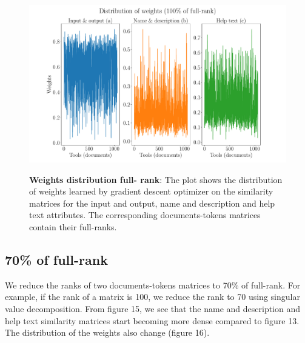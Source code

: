 \begin{figure}[h]
\begin{centering}
    {\includegraphics[scale=0.35]{figures/Weights_100.pdf}}
    \caption[Weights distribution full-rank]{\textbf{Weights distribution full- rank}: The plot shows the distribution of weights learned by gradient descent optimizer on the similarity matrices for the input and output, name and description and help text attributes. The corresponding documents-tokens matrices contain their full-ranks.}
\end{centering}
\end{figure}

\subsection{70\% of full-rank}
We reduce the ranks of two documents-tokens matrices to 70\% of full-rank. For example, if the rank of a matrix is 100, we reduce the rank to 70 using singular value decomposition. From figure 15, we see that the name and description and help text similarity matrices start becoming more dense compared to figure 13. The distribution of the weights also change (figure 16).

